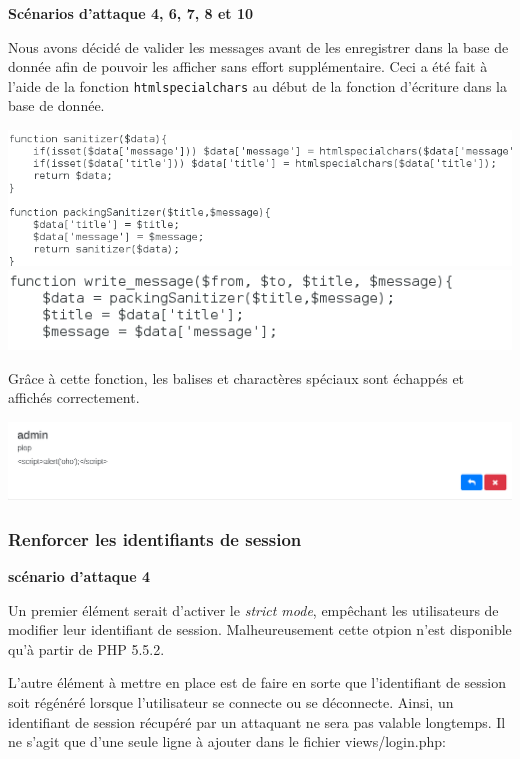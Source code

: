 \documentclass{article}
\begin{document}
\textbf{Scénarios d'attaque 4, 6, 7, 8 et 10}

Nous avons décidé de valider les messages avant de les enregistrer dans
la base de donnée afin de pouvoir les afficher sans effort
supplémentaire. Ceci a été fait à l'aide de la fonction
\texttt{htmlspecialchars} au début de la fonction d'écriture dans la
base de donnée.

\includegraphics[width=\textwidth]{images/sanitize.PNG}
\includegraphics[width=\textwidth]{images/sanitize3.PNG}

Grâce à cette fonction, les balises et charactères spéciaux sont
échappés et affichés correctement.

\includegraphics[width=\textwidth]{images/xss_impl1.png}

\subsubsection{Renforcer les identifiants de session}

\textbf{scénario d'attaque 4}

Un premier élément serait d'activer le \emph{strict mode}, empêchant les
utilisateurs de modifier leur identifiant de session. Malheureusement
cette otpion n'est disponible qu'à partir de PHP 5.5.2.

L'autre élément à mettre en place est de faire en sorte que
l'identifiant de session soit régénéré lorsque l'utilisateur se connecte
ou se déconnecte. Ainsi, un identifiant de session récupéré par un
attaquant ne sera pas valable longtemps. Il ne s'agit que d'une seule
ligne à ajouter dans le fichier views/login.php:
\end{document}

